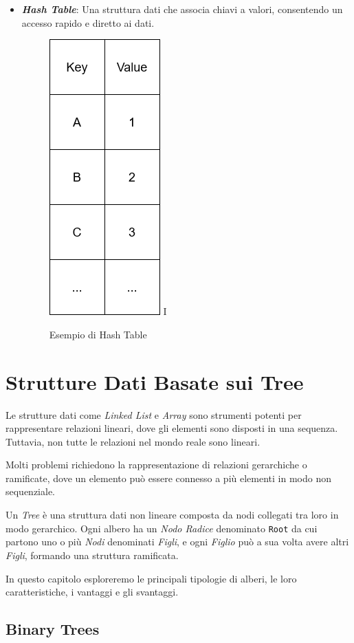\documentclass[12pt,a4paper,openright,twoside]{book}
\begin{document}
\begin{itemize}
            \item \textit{\textbf{Hash Table}}: Una struttura dati che associa chiavi a valori, consentendo un accesso rapido e diretto ai dati.
            \begin{figure} [h]
                \centering
                \includegraphics[width=.15\linewidth]{figures/HashTable.png}
I               \caption{Esempio di Hash Table}
                \label{fig:hash-table}
            \end{figure}
        \end{itemize}

        \cite{cormen2022introduction}

    \section{Strutture Dati Basate sui Tree}

        Le strutture dati come \textit{Linked List} e \textit{Array} sono strumenti potenti per rappresentare relazioni lineari, dove gli elementi sono disposti in una sequenza. Tuttavia, non tutte le relazioni nel mondo reale sono lineari.

        Molti problemi richiedono la rappresentazione di relazioni gerarchiche o ramificate, dove un elemento può essere connesso a più elementi in modo non sequenziale.

        Un \textit{Tree} è una struttura dati non lineare composta da nodi collegati tra loro in modo gerarchico. Ogni albero ha un \textit{Nodo Radice} denominato \texttt{Root} da cui partono uno o più \textit{Nodi} denominati \textit{Figli}, e ogni \textit{Figlio} può a sua volta avere altri \textit{Figli}, formando una struttura ramificata.

        In questo capitolo esploreremo le principali tipologie di alberi, le loro caratteristiche, i vantaggi e gli svantaggi.

        \subsection{Binary Trees}
\end{document}

